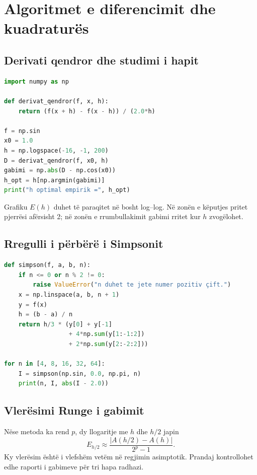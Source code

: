 \section{Algoritmet e diferencimit dhe kuadraturës}
\subsection{Derivati qendror dhe studimi i hapit}
\begin{lstlisting}[language=Python,caption={Gabimi i derivatit qendror për një varg hapash.}]
import numpy as np

def derivat_qendror(f, x, h):
    return (f(x + h) - f(x - h)) / (2.0*h)

f = np.sin
x0 = 1.0
h = np.logspace(-16, -1, 200)
D = derivat_qendror(f, x0, h)
gabimi = np.abs(D - np.cos(x0))
h_opt = h[np.argmin(gabimi)]
print("h optimal empirik =", h_opt)
\end{lstlisting}
Grafiku $E(h)$ duhet të paraqitet në bosht log--log. Në zonën e këputjes pritet pjerrësi afërsisht 2; në zonën e rrumbullakimit gabimi rritet kur $h$ zvogëlohet.

\subsection{Rregulli i përbërë i Simpsonit}
\begin{lstlisting}[language=Python,caption={Integrimi Simpson me kontrollin e numrit çift të nënintervaleve.}]
def simpson(f, a, b, n):
    if n <= 0 or n % 2 != 0:
        raise ValueError("n duhet te jete numer pozitiv çift.")
    x = np.linspace(a, b, n + 1)
    y = f(x)
    h = (b - a) / n
    return h/3 * (y[0] + y[-1]
                  + 4*np.sum(y[1:-1:2])
                  + 2*np.sum(y[2:-2:2]))

for n in [4, 8, 16, 32, 64]:
    I = simpson(np.sin, 0.0, np.pi, n)
    print(n, I, abs(I - 2.0))
\end{lstlisting}

\subsection{Vlerësimi Runge i gabimit}
Nëse metoda ka rend $p$, dy llogaritje me $h$ dhe $h/2$ japin
\begin{equation}
 E_{h/2}\approx\frac{|A(h/2)-A(h)|}{2^p-1}.
\end{equation}
Ky vlerësim është i vlefshëm vetëm në regjimin asimptotik. Prandaj kontrollohet edhe raporti i gabimeve për tri hapa radhazi.

